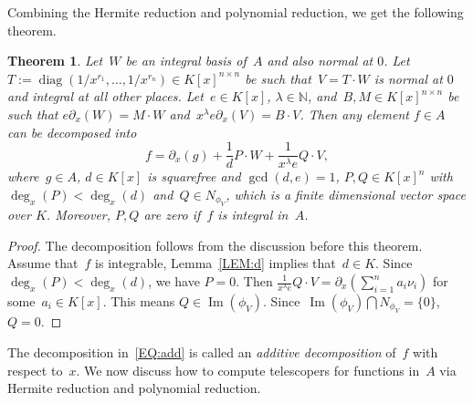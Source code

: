 \documentclass{sig-alternate}
\newtheorem{theorem}{Theorem}
\newcommand{\bN}{ {\mathbb N}}
\def\im{\operatorname{Im}}
\def\diag{\operatorname{diag}}
\begin{document}
Combining the Hermite reduction and polynomial reduction, we get the following theorem.
\begin{theorem}\label{THM:polyred}
Let~$W$ be an integral basis of~$A$ and also normal at $0$. Let~$T := \diag(1/x^{r_1}, \ldots, 1/x^{r_n}) \in K[x]^{n\times n}$
be such that~$V = T\cdot W$ is normal at $0$ and integral at all other places.
Let~$e\in K[x]$, $\lambda \in \bN$, and~$B, M \in K[x]^{n \times n} $ be such that
$e \partial_x (W) = M \cdot W$ and~$x^\lambda e \partial_x (V) = B\cdot V$.
Then any element $f\in A$ can be decomposed into
\begin{equation}\label{EQ:add}
f = \partial_x(g) + \frac{1}{d} P\cdot W + \frac{1}{x^\lambda e} Q\cdot V,
\end{equation}
where~$g\in A$, $d\in K[x]$ is squarefree and $\gcd(d, e)=1$, $P, Q\in K[x]^n$ with $\deg_x(P) < \deg_x(d)$ and~$Q\in N_{\phi_{V}}$, which is
a finite dimensional vector space over $K$. Moreover, $P, Q$ are zero if~$f$ is integral in~$A$.
\end{theorem}
\begin{proof}
The decomposition follows from the discussion before this theorem.
Assume that~$f$ is integrable, Lemma~\ref{LEM:d} implies that~$d\in K$.
Since~$\deg_x(P) < \deg_x(d)$, we have $P=0$. Then $\frac{1}{x^\lambda e} Q\cdot V = \partial_x(\sum_{i=1}^n a_i \nu_i)$
for some~$a_i\in K[x]$. This means $Q \in \im(\phi_V)$.
Since~$\im(\phi_V) \bigcap N_{\phi_V} = \{0\}$,~$Q=0$.
\end{proof}
The decomposition in~\eqref{EQ:add} is called an \emph{additive decomposition} of~$f$ with respect to~$x$.
We now discuss how to compute telescopers for functions in~$A$ via Hermite reduction and
polynomial reduction.
\end{document}
